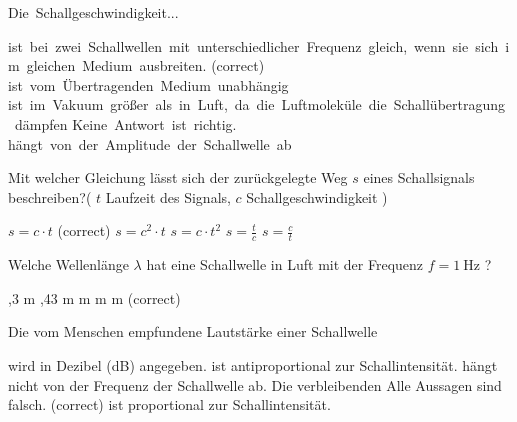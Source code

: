 \documentclass[11pt]{exam}
\begin{document}
\setlength{\voffset}{-0.5in}
\setlength{\headsep}{5pt}

\hspace{2mm}
 \hspace{5mm}
\vspace{4mm}

\begin{questions}

\question Die Schallgeschwindigkeit...

\begin{choices}
	\choice ist bei zwei Schallwellen mit unterschiedlicher Frequenz gleich, wenn sie sich im gleichen Medium ausbreiten. (correct)
	\choice ist vom Übertragenden Medium unabhängig
	\choice ist im Vakuum größer als in Luft, da die Luftmoleküle die Schallübertragung dämpfen
	\choice Keine Antwort ist richtig.
	\choice hängt von der Amplitude der Schallwelle ab
\end{choices}

\vspace{3mm}\question Mit welcher Gleichung lässt sich der zurückgelegte Weg \( s \) eines Schallsignals beschreiben?( \( t \) Laufzeit des Signals, \( c \) Schallgeschwindigkeit )

\begin{choices}
	\choice \( s=c \cdot t \) (correct)
	\choice \( s=c^2 \cdot t \)
	\choice \( s = c \cdot t^2 \)
	\choice \( s= \frac{t}{c} \)
	\choice \( s= \frac{c}{t} \)
\end{choices}

\vspace{3mm}\question Welche Wellenlänge \( \lambda \) hat eine Schallwelle in Luft mit der Frequenz \( f = \mathrm{1~Hz} \) ?

\begin{choices}
	,3 m
	,43 m
	 m
	 m
	 m (correct)
\end{choices}

\vspace{3mm}\question Die vom Menschen empfundene Lautstärke einer Schallwelle

\begin{choices}
	\choice wird in Dezibel (dB) angegeben.
	\choice ist antiproportional zur Schallintensität.
	\choice hängt nicht von der Frequenz der Schallwelle ab.
	\choice Die verbleibenden Alle Aussagen sind falsch. (correct)
	\choice ist proportional zur Schallintensität.
\end{choices}


\end{questions}
\end{document}
